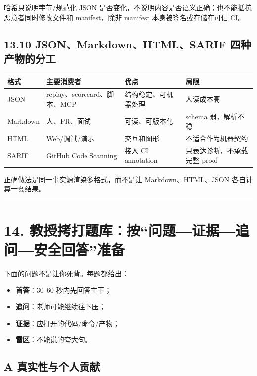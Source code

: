 \documentclass[UTF8,12pt,openany]{ctexbook}
\begin{document}
哈希只说明字节/规范化 JSON 是否变化，不说明内容是否语义正确；也不能抵抗恶意者同时修改文件和 manifest，除非 manifest 本身被签名或存储在可信 CI。\par

\subsection{13.10 JSON、Markdown、HTML、SARIF 四种产物的分工}

\begin{center}
\small
\begin{longtable}{|p{}|p{}|p{}|p{}|}
\toprule
格式 & 主要消费者 & 优点 & 局限 \\
\midrule
JSON & replay、scorecard、脚本、MCP & 结构稳定、可机器处理 & 人读成本高 \\
Markdown & 人、PR、面试 & 可读、可版本化 & schema 弱，解析不稳 \\
HTML & Web/调试/演示 & 交互和图形 & 不适合作为机器契约 \\
SARIF & GitHub Code Scanning & 接入 CI annotation & 只表达诊断，不承载完整 proof \\
\bottomrule
\end{longtable}
\end{center}

正确做法是同一事实源渲染多格式，而不是让 Markdown、HTML、JSON 各自计算一套结果。\par

\hrule

\section{14. 教授拷打题库：按“问题—证据—追问—安全回答”准备}

下面的问题不是让你死背。每题都给出：\par

\begin{itemize}
\item \textbf{首答}：30–60 秒内先回答主干；
\item \textbf{追问}：老师可能继续往下压；
\item \textbf{证据}：应打开的代码/命令/产物；
\item \textbf{雷区}：不能说的夸大句。
\end{itemize}

\subsection{A 真实性与个人贡献}
\end{document}
